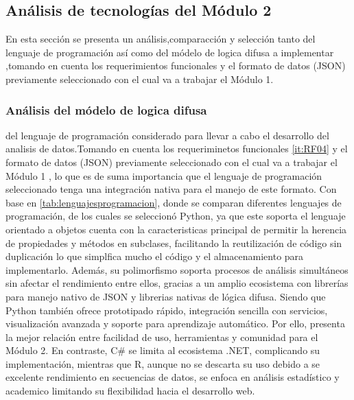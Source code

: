 \subsection{Análisis de tecnologías del Módulo 2}

En esta sección se presenta un análisis,comparacción y selección
tanto del lenguaje de programación así como del módelo de logica difusa a implementar
,tomando en cuenta los requerimientos funcionales y 
el formato de datos (JSON) previamente seleccionado con el cual va a trabajar el Módulo 1.

\subsubsection{Análisis del módelo de logica difusa}



del lenguaje de programación considerado para llevar a cabo el 
desarrollo del analisis de datos.Tomando en cuenta los requeriminetos 
funcionales \ref{it:RF04} y el formato de datos (JSON) previamente seleccionado con 
el cual va a trabajar el Módulo 1 , 
lo que es de suma importancia que el lenguaje de programación
seleccionado tenga una integración nativa para el manejo de este formato.
\newline
\newline
Con base en \cref{tab:lenguajesprogramacion}, donde se comparan diferentes lenguajes de programación, 
de los cuales se seleccionó Python, ya que este soporta el lenguaje orientado a objetos cuenta con la 
caracteristicas principal de permitir
la herencia de propiedades y
métodos en subclases, facilitando la reutilización de código sin duplicación lo que simplfica mucho el código
y el almacenamiento para implementarlo. 
\newline
Además, su polimorfismo
soporta procesos de análisis simultáneos sin afectar el rendimiento entre ellos, gracias a un amplio ecosistema 
con librerías para manejo nativo de JSON y librerias nativas de lógica difusa. 
Siendo que Python también ofrece prototipado rápido, integración sencilla 
con servicios, visualización avanzada y soporte para aprendizaje automático. Por ello, presenta la mejor 
relación entre facilidad de uso, herramientas y comunidad para el Módulo 2. En contraste, C\# se limita al 
ecosistema .NET, complicando su implementación, mientras que R, aunque  no se descarta su uso debido a 
se excelente rendimiento en secuencias de datos, se enfoca en análisis estadístico y academico
limitando su flexibilidad hacia el desarrollo web.



